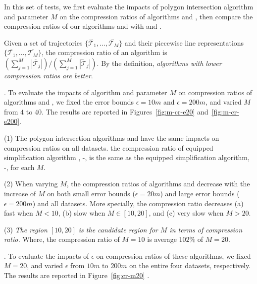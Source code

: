 In this set of tests, we first evaluate the impacts of polygon intersection algorithm \rpia and parameter $M$ on the compression ratios of algorithms \cist and \cista, then compare the compression ratios of our algorithms \cist and \cista with \dpa and \squishe.

Given a set of trajectories $\{\dddot{\mathcal{T}_1}, \ldots, \dddot{\mathcal{T}_M}\}$ and their piecewise line representations $\{\overline{\mathcal{T}_1}, \ldots, \overline{\mathcal{T}_M}\}$, the compression ratio of an algorithm is $(\sum_{j=1}^{M} |\overline{\mathcal{T}}_j |)/(\sum_{j=1}^{M} |\dddot{\mathcal{T}}_j |)$.
By the definition, \emph{algorithms with lower compression ratios are better}.




.
To evaluate the impacts of algorithm \rpia and parameter $M$ on compression ratios of algorithms \cist and \cista, we fixed the error bounds \textcolor[rgb]{1.00,0.00,0.00}{$\epsilon =10m$} and $\epsilon =200m$, and varied $M$ from $4$ to $40$.
The results are reported in Figures~\ref{fig:m-cr-e20} and~\ref{fig:m-cr-e200}.


\ni(1) The polygon intersection algorithms \rpia and \cpia have the same impacts on compression ratios on all datasets. \eg the compression ratio of \rpia equipped simplification algorithm \cist, \ie \cist-\rpia, is the same as the \cpia equipped simplification algorithm, \ie \cist-\cpia, for each $M$.


\ni(2) When varying $M$, the compression ratios of algorithms \cist and \cista decrease with the increase of $M$ on both small error bounds \textcolor[rgb]{1.00,0.00,0.00}{(\eg $\epsilon = 20m$)} and large error bounds (\eg $\epsilon = 200m$) and all datasets.
More specially, the compression ratio decreases (a) fast when $M < 10$, (b) slow when $M \in [10, 20]$, and (c) very slow when $M  > 20$.


\ni(3) \emph{The region $[10, 20]$ is the candidate region for $M$ in terms of compression ratio.}
Where, the compression ratio of $M=10$ is average \textcolor[rgb]{1.00,0.00,0.00}{$102\%$} of $M=20$. 


.
To evaluate the impacts of $\epsilon$ on compression ratios of these algorithms, we fixed $M=20$, and varied $\epsilon$ from $10m$ to $200m$ on the entire four datasets, respectively.
The results are reported in Figure~\ref{fig:cr-m20} .


